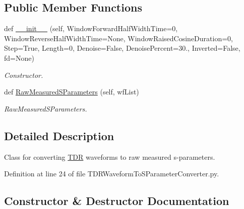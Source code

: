 \subsection*{Public Member Functions}
\begin{DoxyCompactItemize}
\item 
def \hyperlink{classSignalIntegrity_1_1Measurement_1_1TDR_1_1TDRWaveformToSParameterConverter_1_1TDRWaveformToSParameterConverter_a85d11b8192fdd839d48a2d7e1abf4a5d}{\+\_\+\+\_\+init\+\_\+\+\_\+} (self, Window\+Forward\+Half\+Width\+Time=0, Window\+Reverse\+Half\+Width\+Time=None, Window\+Raised\+Cosine\+Duration=0, Step=True, Length=0, Denoise=False, Denoise\+Percent=30., Inverted=False, fd=None)
\begin{DoxyCompactList}\small\item\em Constructor. \end{DoxyCompactList}\item 
def \hyperlink{classSignalIntegrity_1_1Measurement_1_1TDR_1_1TDRWaveformToSParameterConverter_1_1TDRWaveformToSParameterConverter_a6ff074fa355062d77a954060b9107410}{Raw\+Measured\+S\+Parameters} (self, wf\+List)
\begin{DoxyCompactList}\small\item\em Raw\+Measured\+S\+Parameters. \end{DoxyCompactList}\end{DoxyCompactItemize}


\subsection{Detailed Description}
Class for converting \hyperlink{namespaceSignalIntegrity_1_1Measurement_1_1TDR}{T\+DR} waveforms to raw measured s-\/parameters. 

Definition at line 24 of file T\+D\+R\+Waveform\+To\+S\+Parameter\+Converter.\+py.



\subsection{Constructor \& Destructor Documentation}
\mbox{\label{classSignalIntegrity_1_1Measurement_1_1TDR_1_1TDRWaveformToSParameterConverter_1_1TDRWaveformToSParameterConverter_a85d11b8192fdd839d48a2d7e1abf4a5d}} 
